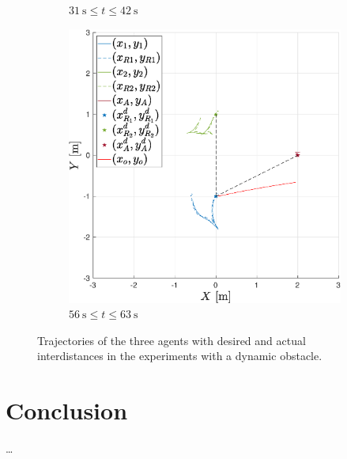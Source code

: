 \documentclass{ifacconf}
\begin{document}
\begin{figure}
\begin{subfigure}[b]{0.32\columnwidth}
         \caption{$\SI{31}{\second} \leq  t \leq \SI{42}{\second}$}
         \label{fig:exp_dynamicObstacles_2}
    \end{subfigure}
    \begin{subfigure}[b]{0.32\columnwidth}
        \centering
        \includegraphics[width=\linewidth]{images/experiment/dynamic_obstacles/dynamicObst_exp_closeR1_bigger.eps}
        \caption{$\SI{56}{\second} \leq  t \leq \SI{63}{\second}$}
        \label{fig:exp_dynamicObstacles_3}
    \end{subfigure}
    \vspace{-0.2cm}
    \caption{Trajectories of the three agents with desired and actual interdistances 
   in the experiments with a dynamic obstacle.}
    \label{fig:exp_dynamicObstacles}
\end{figure}

\section{Conclusion}
\label{sec:conclusion}

\dots

\end{document}
